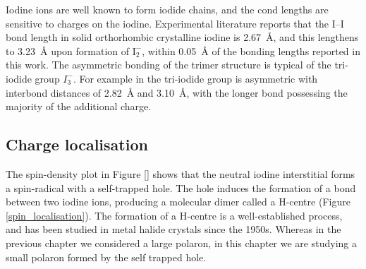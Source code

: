 Iodine ions are well known to form iodide chains, and the cond lengths are sensitive to charges on the iodine.
Experimental literature reports that the I--I bond length in solid orthorhombic crystalline iodine is \SI{2.67}{\angstrom}, and this lengthens to \SI{3.23}{\angstrom} upon formation of $\mathrm{I}_2^-$, within \SI{0.05}{\angstrom} of the bonding lengths reported in this work.
The asymmetric bonding of the trimer structure is typical of the tri-iodide group $I_3^-$. For example in  the tri-iodide group is asymmetric with interbond distances of \SI{2.82}{\angstrom} and \SI{3.10}{\angstrom}, with the longer bond possessing the majority of the additional charge. 


\subsection{Charge localisation} \label{ss:chglocal}
The spin-density plot in Figure \ref{} shows that the neutral iodine interstitial forms a spin-radical with a self-trapped hole.
The hole induces the formation of a bond between two iodine ions, producing a molecular dimer called a H-centre (Figure \ref{spin_localisation}). The formation of a H-centre is a well-established process, and has been studied in metal halide crystals since the 1950s.\autocite{} %
Whereas in the previous chapter we considered a large polaron, in this chapter we are studying a small polaron formed by the self trapped hole.

